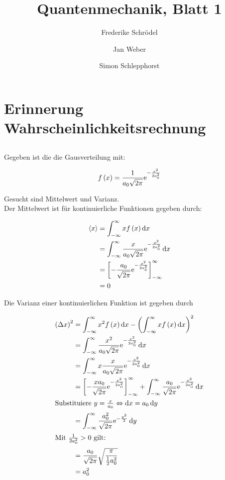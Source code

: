 \documentclass[11pt, ngerman, fleqn, DIV=15, headinclude]{scrartcl}
\title{Quantenmechanik, Blatt 1}
\author{
    Frederike Schrödel \and Jan Weber \and Simon Schlepphorst
}
\begin{document}
\maketitle

\setcounter{section}{1}

\section{Erinnerung Wahrscheinlichkeitsrechnung}

\subsection{}

Gegeben ist die die Gausverteilung mit:

\begin{align*}
  f\left( x \right)=\frac1{a_0\sqrt{2\pi}}\mathrm e^{-\frac{x^2}{2a_0^2}}
\end{align*}

Gesucht sind Mittelwert und Varianz.\\
Der Mittelwert ist für kontinuierliche Funktionen gegeben durch:

\begin{align*}
  \langle x \rangle	&=\int_{-\infty}^{\infty}xf\left( x \right)\mathop{}\!\mathrm d x\\
		&=\int_{-\infty}^{\infty}\frac{x}{a_0\sqrt{2\pi}}\mathrm e^{-\frac{x^2}{2a_0^2}}\mathop{}\!\mathrm d x\\
		&=\left[-\frac{a_0}{\sqrt{2\pi}}\mathrm e^{-\frac{x^2}{2a_0^2}}\right]_{-\infty}^{\infty}\\
		&=0
\end{align*}

Die Varianz einer kontinuierlichen Funktion ist gegeben durch

\begin{align*}
  \del{\Delta x}^2	&=\int_{-\infty}^{\infty}x^2f\del{x}\dif x-\del{\int_{-\infty}^{\infty}xf\del{x}\dif x}^2\\
  					&=\int_{-\infty}^{\infty}\frac{x^2}{a_0\sqrt{2\pi}}\eup^{-\frac{x^2}{2a_0^2}}\dif x\\
  					&=\int_{-\infty}^{\infty}x\frac{x}{a_0\sqrt{2\pi}}\eup^{-\frac{x^2}{2a_0^2}}\dif x\\
  					&=\left[-\frac{xa_0}{\sqrt{2\pi}}\eup^{-\frac{x^2}{2a_0^2}}\right]_{-\infty}^{\infty} + \int_{-\infty}^{\infty}\frac{a_0}{\sqrt{2\pi}}\eup^{-\frac{x^2}{2a_0^2}}\dif x\\
  \intertext{%
  	Substituiere $y=\frac{x}{a_0}\Leftrightarrow\dif x=a_0\dif y$
  }
  					&=\int_{-\infty}^{\infty}\frac{a_0^2}{\sqrt{2\pi}}\eup^{-\frac{y^2}{2}}\dif y\\
 \intertext{Mit $\frac1{2a_0^2} > 0$ gilt:}
 &=\frac{a_0}{\sqrt{2\pi}} \sqrt{\frac{\pi}{\frac12 a_0^2}}\\
 &=a_0^2
\end{align*}
\end{document}
